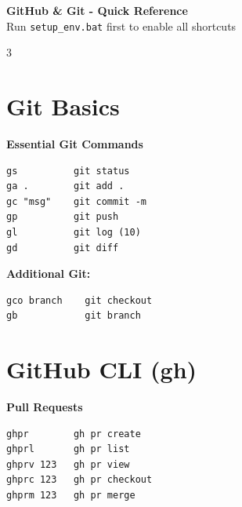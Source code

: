 \documentclass[11pt,landscape]{article}
\begin{document}
\begin{center}
\textbf{\Huge GitHub \& Git - Quick Reference}\\
\vspace{6pt}
\large Run \texttt{setup\_env.bat} first to enable all shortcuts
\end{center}

\vspace{8pt}

\begin{multicols}{3}
\raggedright

\section*{Git Basics}

\begin{tcolorbox}[colback=highlightbg,colframe=gitcolor,boxrule=1.5pt,arc=2pt,left=6pt,right=6pt,top=4pt,bottom=4pt]
\textbf{\large Essential Git Commands}

\vspace{4pt}

\begin{Verbatim}[fontsize=\large,frame=none]
gs          git status
ga .        git add .
gc "msg"    git commit -m
gp          git push
gl          git log (10)
gd          git diff
\end{Verbatim}
\end{tcolorbox}

\vspace{6pt}

\textbf{Additional Git:}
\begin{Verbatim}[fontsize=\normalsize,frame=single]
gco branch    git checkout
gb            git branch
\end{Verbatim}

\section*{GitHub CLI (gh)}

\begin{tcolorbox}[colback=highlightbg,colframe=sectioncolor,boxrule=1pt,arc=2pt,left=6pt,right=6pt,top=4pt,bottom=4pt]
\textbf{\large Pull Requests}

\vspace{4pt}

\begin{Verbatim}[fontsize=\large,frame=none]
ghpr        gh pr create
ghprl       gh pr list
ghprv 123   gh pr view
ghprc 123   gh pr checkout
ghprm 123   gh pr merge
\end{Verbatim}
\end{tcolorbox}


\end{multicols}
\end{document}

